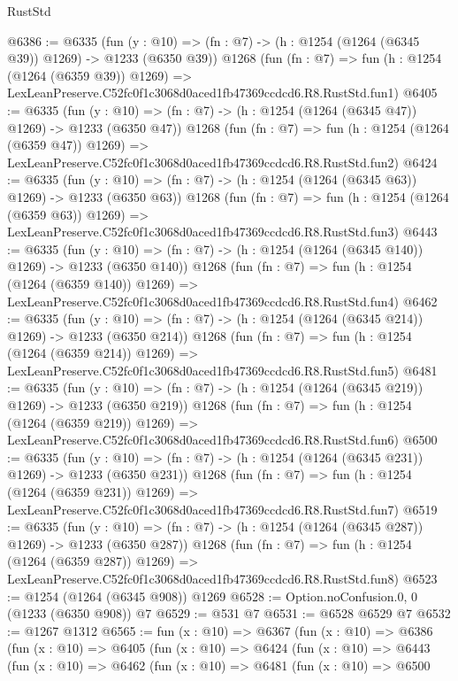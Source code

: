 \begin{lexlean}{RustStd}
\begin{coremodule}
@6386 := @6335
    (fun (y : @10) => (fn : @7) -> (h : @1254 (@1264 (@6345 @39)) @1269) -> @1233 (@6350 @39))
    @1268
    (fun (fn : @7) =>
    fun (h : @1254 (@1264 (@6359 @39)) @1269) =>
    LexLeanPreserve.C52fc0f1c3068d0aced1fb47369ccdcd6.R8.RustStd.fun1)
@6405 := @6335
    (fun (y : @10) => (fn : @7) -> (h : @1254 (@1264 (@6345 @47)) @1269) -> @1233 (@6350 @47))
    @1268
    (fun (fn : @7) =>
    fun (h : @1254 (@1264 (@6359 @47)) @1269) =>
    LexLeanPreserve.C52fc0f1c3068d0aced1fb47369ccdcd6.R8.RustStd.fun2)
@6424 := @6335
    (fun (y : @10) => (fn : @7) -> (h : @1254 (@1264 (@6345 @63)) @1269) -> @1233 (@6350 @63))
    @1268
    (fun (fn : @7) =>
    fun (h : @1254 (@1264 (@6359 @63)) @1269) =>
    LexLeanPreserve.C52fc0f1c3068d0aced1fb47369ccdcd6.R8.RustStd.fun3)
@6443 := @6335
    (fun (y : @10) => (fn : @7) -> (h : @1254 (@1264 (@6345 @140)) @1269) -> @1233 (@6350 @140))
    @1268
    (fun (fn : @7) =>
    fun (h : @1254 (@1264 (@6359 @140)) @1269) =>
    LexLeanPreserve.C52fc0f1c3068d0aced1fb47369ccdcd6.R8.RustStd.fun4)
@6462 := @6335
    (fun (y : @10) => (fn : @7) -> (h : @1254 (@1264 (@6345 @214)) @1269) -> @1233 (@6350 @214))
    @1268
    (fun (fn : @7) =>
    fun (h : @1254 (@1264 (@6359 @214)) @1269) =>
    LexLeanPreserve.C52fc0f1c3068d0aced1fb47369ccdcd6.R8.RustStd.fun5)
@6481 := @6335
    (fun (y : @10) => (fn : @7) -> (h : @1254 (@1264 (@6345 @219)) @1269) -> @1233 (@6350 @219))
    @1268
    (fun (fn : @7) =>
    fun (h : @1254 (@1264 (@6359 @219)) @1269) =>
    LexLeanPreserve.C52fc0f1c3068d0aced1fb47369ccdcd6.R8.RustStd.fun6)
@6500 := @6335
    (fun (y : @10) => (fn : @7) -> (h : @1254 (@1264 (@6345 @231)) @1269) -> @1233 (@6350 @231))
    @1268
    (fun (fn : @7) =>
    fun (h : @1254 (@1264 (@6359 @231)) @1269) =>
    LexLeanPreserve.C52fc0f1c3068d0aced1fb47369ccdcd6.R8.RustStd.fun7)
@6519 := @6335
    (fun (y : @10) => (fn : @7) -> (h : @1254 (@1264 (@6345 @287)) @1269) -> @1233 (@6350 @287))
    @1268
    (fun (fn : @7) =>
    fun (h : @1254 (@1264 (@6359 @287)) @1269) =>
    LexLeanPreserve.C52fc0f1c3068d0aced1fb47369ccdcd6.R8.RustStd.fun8)
@6523 := @1254 (@1264 (@6345 @908)) @1269
@6528 := Option.noConfusion.{0, 0} (@1233 (@6350 @908)) @7
@6529 := @531 @7
@6531 := @6528 @6529 @7
@6532 := @1267 @1312
@6565 := fun (x : @10) =>
  @6367
    (fun (x : @10) =>
    @6386
      (fun (x : @10) =>
      @6405
        (fun (x : @10) =>
        @6424
          (fun (x : @10) =>
          @6443
            (fun (x : @10) =>
            @6462
              (fun (x : @10) =>
              @6481
                (fun (x : @10) =>
                @6500

\end{coremodule}
\end{lexlean}
